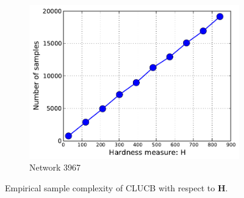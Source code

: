 \documentclass{article}
\newcommand{\Algorithm}{{\small \textsf{CLUCB}}\xspace}
\begin{document}
\begin{figure}[htbp]
\begin{subfigure}[c]{\imgsize\textwidth}
	\includegraphics[width=\textwidth]{fig/exp/mst-cs-3967}
	\caption{Network 3967}
\end{subfigure}
\caption{Empirical sample complexity of \Algorithm with respect to $\mathbf H$.}
\label{fig:exp2}
\end{figure}
\end{document}
